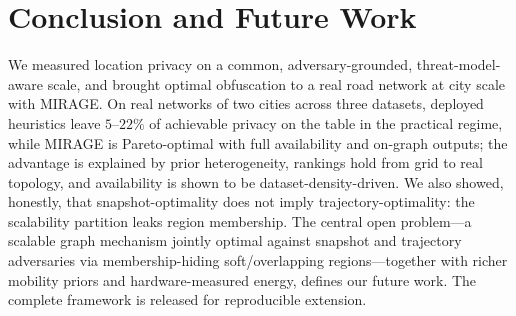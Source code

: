 \documentclass[10pt,journal,compsoc]{IEEEtran}
\begin{document}
\section{Conclusion and Future Work}
\label{sec:conclusion}
We measured location privacy on a common, adversary-grounded, threat-model-aware
scale, and brought optimal obfuscation to a real road network at city scale with
MIRAGE. On real networks of two cities across three datasets, deployed heuristics
leave $5$--$22\%$ of achievable privacy on the table in the practical regime,
while MIRAGE is Pareto-optimal with full availability and on-graph outputs; the
advantage is explained by prior heterogeneity, rankings hold from grid to real
topology, and availability is shown to be dataset-density-driven. We also showed,
honestly, that snapshot-optimality does not imply trajectory-optimality: the
scalability partition leaks region membership. The central open problem---a
scalable graph mechanism jointly optimal against snapshot and trajectory
adversaries via membership-hiding soft/overlapping regions---together with richer
mobility priors and hardware-measured energy, defines our future work. The
complete framework is released for reproducible extension.
\end{document}
